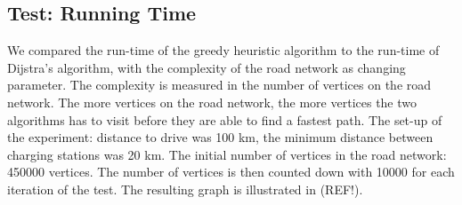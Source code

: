 \subsection{Test: Running Time}

We compared the run-time of the greedy heuristic algorithm to the run-time of Dijstra's algorithm, with the complexity of the road network as changing parameter. The complexity is measured in the number of vertices on the road network. The more vertices on the road network, the more vertices the two algorithms has to visit before they are able to find a fastest path. The set-up of the experiment: distance to drive was 100 km, the minimum distance between charging stations was 20 km. The initial number of vertices in the road network: 450000 vertices. The number of vertices is then counted down with 10000 for each iteration of the test. The resulting graph is illustrated in (REF!).